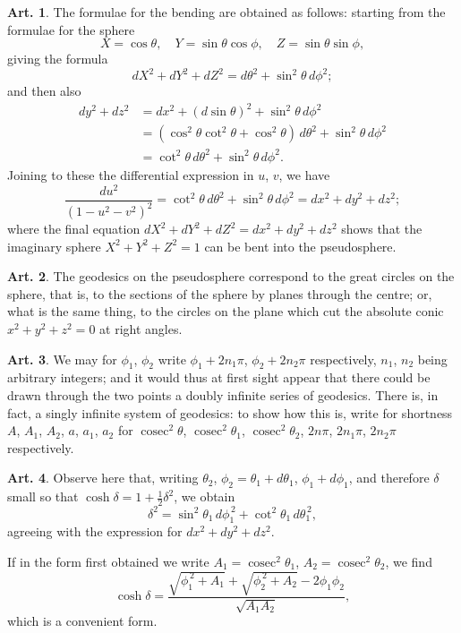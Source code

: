 \documentclass[11pt,a4paper]{article}
\theoremstyle{definition}
\newtheorem{art}{Art.}[section]
\DeclareMathOperator{\cosec}{cosec}
\begin{document}
\begin{art}
The formulae for the bending are obtained as follows: starting from the formulae for the sphere
\[
X = \cos\theta, \quad Y = \sin\theta\cos\phi, \quad Z = \sin\theta\sin\phi,
\]
giving the formula
\[
dX^2 + dY^2 + dZ^2 = d\theta^2 + \sin^2\theta\,d\phi^2;
\]
and then also
\begin{align*}
dy^2 + dz^2 &= dx^2 + (d\sin\theta)^2 + \sin^2\theta\,d\phi^2 \\
&= (\cos^2\theta \cot^2\theta + \cos^2\theta)\,d\theta^2 + \sin^2\theta\,d\phi^2 \\
&= \cot^2\theta\,d\theta^2 + \sin^2\theta\,d\phi^2.
\end{align*}
Joining to these the differential expression in $u$, $v$, we have
\[
\frac{du^2}{(1-u^2-v^2)^2} = \cot^2\theta\,d\theta^2 + \sin^2\theta\,d\phi^2 = dx^2 + dy^2 + dz^2;
\]
where the final equation $dX^2 + dY^2 + dZ^2 = dx^2 + dy^2 + dz^2$ shows that the imaginary sphere $X^2 + Y^2 + Z^2 = 1$ can be bent into the pseudosphere.
\end{art}

\begin{art}
The geodesics on the pseudosphere correspond to the great circles on the sphere, that is, to the sections of the sphere by planes through the centre; or, what is the same thing, to the circles on the plane which cut the absolute conic $x^2+y^2+z^2 = 0$ at right angles.
\end{art}

\begin{art}
We may for $\phi_1$, $\phi_2$ write $\phi_1 + 2n_1\pi$, $\phi_2 + 2n_2\pi$ respectively, $n_1$, $n_2$ being arbitrary integers; and it would thus at first sight appear that there could be drawn through the two points a doubly infinite series of geodesics. There is, in fact, a singly infinite system of geodesics: to show how this is, write for shortness $A$, $A_1$, $A_2$, $a$, $a_1$, $a_2$ for $\cosec^2\theta$, $\cosec^2\theta_1$, $\cosec^2\theta_2$, $2n\pi$, $2n_1\pi$, $2n_2\pi$ respectively.
\end{art}

\begin{art}
Observe here that, writing $\theta_2$, $\phi_2 = \theta_1 + d\theta_1$, $\phi_1 + d\phi_1$, and therefore $\delta$ small so that $\cosh\delta = 1 + \frac{1}{2}\delta^2$, we obtain
\[
\delta^2 = \sin^2\theta_1\,d\phi_1^{\,2} + \cot^2\theta_1\,d\theta_1^{\,2},
\]
agreeing with the expression for $dx^2 + dy^2 + dz^2$.

If in the form first obtained we write $A_1 = \cosec^2\theta_1$, $A_2 = \cosec^2\theta_2$, we find
\[
\cosh\delta = \frac{\sqrt{\phi_1^{\,2} + A_1} + \sqrt{\phi_2^{\,2} + A_2} - 2\phi_1\phi_2}{\sqrt{A_1A_2}},
\]
which is a convenient form.
\end{art}
\end{document}

